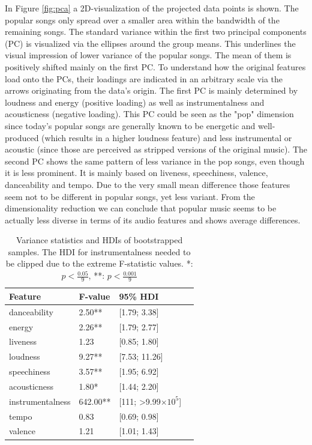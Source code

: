 \documentclass{article}
\begin{document}
In Figure \ref{fig:pca} a 2D-visualization of the projected data points is shown. The popular songs only spread over a smaller area within the bandwidth of the remaining songs. The standard variance within the first two principal components (PC) is visualized via the ellipses around the group means. This underlines the visual impression of lower variance of the popular songs. The mean of them is positively shifted mainly on the first PC. To understand how the original features load onto the PCs, their loadings are indicated in an arbitrary scale via the arrows originating from the data's origin. The first PC is mainly determined by loudness and energy (positive loading) as well as instrumentalness and acousticness (negative loading). This PC could be seen as the "pop" dimension since today's popular songs are generally known to be energetic and well-produced (which results in a higher loudness feature) and less instrumental or acoustic (since those are perceived as stripped versions of the original music). The second PC shows the same pattern of less variance in the pop songs, even though it is less prominent. It is mainly based on liveness, speechiness, valence, danceability and tempo. Due to the very small mean difference those features seem not to be different in popular songs, yet less variant. From the dimensionality reduction we can conclude that popular music seems to be actually less diverse in terms of its audio features and shows average differences.

\begin{table}[h!]
  
  \label{tab:var}
  \centering
  \begin{tabular}{lllc}
    \toprule
    Feature     & F-value & 95\% HDI\\
    \midrule
	danceability        	&  2.50** & [1.79; 3.38]\\
	energy              		&  2.26** & [1.79; 2.77]\\
	liveness            		&  1.23   & [0.85; 1.80]\\
	loudness            	&  9.27** & [7.53; 11.26]\\
	speechiness         	&  3.57** & [1.95; 6.92]\\
	acousticness        	&  1.80*  & [1.44; 2.20]\\
	instrumentalness    	&642.00** & [111; >9.99\(\times 10^{5}\)]\\
	tempo               		&  0.83   & [0.69; 0.98]\\
	valence             	&  1.21   & [1.01; 1.43]\\
    \bottomrule
  \end{tabular}
\vspace*{2mm}
  \caption{Variance statistics and HDIs of bootstrapped samples. The HDI for instrumentalness needed to be clipped due to the extreme F-statistic values. *: $p<\frac{0.05}{9}$, **: $p<\frac{0.001}{9}$}
  \vspace*{-5mm}
\end{table}
\end{document}
